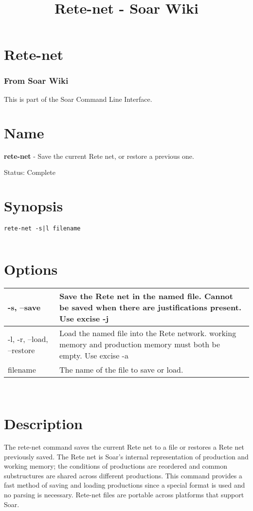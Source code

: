\documentclass[10pt]{article}
\title{Rete-net - Soar Wiki}
\begin{document}
\section*{Rete-net}
\subsubsection*{From Soar Wiki}


 This is part of the Soar Command Line Interface. 
\section*{ Name }


 \textbf{rete-net}
 - Save the current Rete net, or restore a previous one. 


 Status: Complete
\section*{ Synopsis }
\begin{verbatim}
rete-net -s|l filename
 

\end{verbatim}
\section*{ Options }


\begin{tabular}{|p{1in}|p{5in}|}
\hline 
 -s, --save  & Save the Rete net in the named file. Cannot be saved when there are justifications present. Use excise -j \\
 \hline 
 -l, -r, --load, --restore  & Load the named file into the Rete network. working memory and production memory must both be empty. Use excise -a \\
 \hline 
filename & The name of the file to save or load.  \\
 \hline 

\end{tabular}



 \\ 

\section*{ Description }


 The rete-net command saves the current Rete net to a file or restores a Rete net previously saved. The Rete net is Soar's internal representation of production and working memory; the conditions of productions are reordered and common substructures are shared across different productions. This command provides a fast method of saving and loading productions since a special format is used and no parsing is necessary. Rete-net files are portable across platforms that support Soar. 
\end{document}
